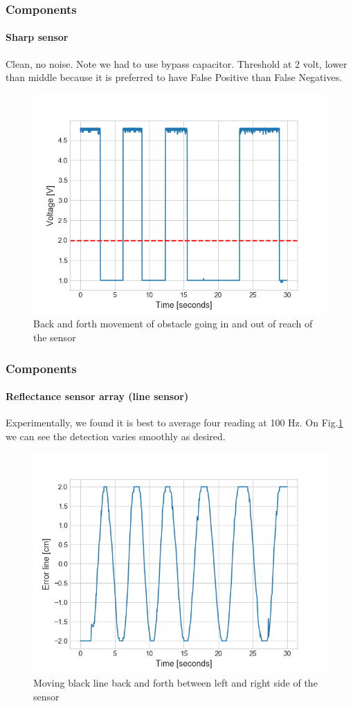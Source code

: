 \documentclass[10pt]{beamer}
\begin{document}
\begin{frame}
\frametitle{Components}
\framesubtitle{Sharp sensor}
Clean, no noise. Note we had to use bypass capacitor. Threshold at 2 volt, lower than middle because it is preferred to have False Positive than False Negatives.
\begin{figure}[hbtp]
\centering
\includegraphics[scale=0.45]{figures/sharp-flow.png}
\caption{Back and forth movement of obstacle going in and out of reach of the sensor}
\end{figure}
\end{frame}



\begin{frame}
\frametitle{Components}
\framesubtitle{Reflectance sensor array (line sensor)}
Experimentally, we found it is best to average four reading at 100 Hz. On Fig.\ref{fig:flow-qtr} we can see the detection varies smoothly as desired.
\begin{figure}[hbtp]
\centering
\label{fig:flow-qtr}
\includegraphics[scale=0.45]{figures/qtr-flow.png}
\caption{Moving black line back and forth between left and right side of the sensor}
\end{figure}
\end{frame}
\end{document}
